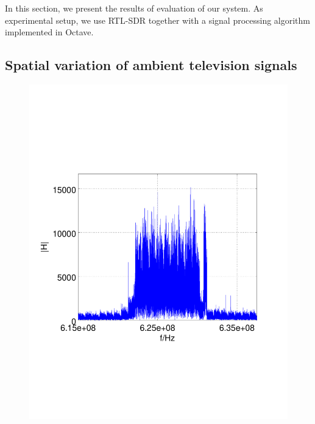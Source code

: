 
In this section, we present the results of evaluation of our system. As experimental 
setup, we use RTL-SDR together with a signal processing algorithm implemented
in Octave. 

\subsection{Spatial variation of ambient television signals}

\begin{figure}[h]
	\centering
	\begin{minipage}{0.49\columnwidth}
	\includegraphics[width=\columnwidth]{./fig/626mhz_raw}
	\end{minipage}
	\hfill
	\begin{minipage}{0.49\columnwidth}

\end{minipage}
\end{figure}

